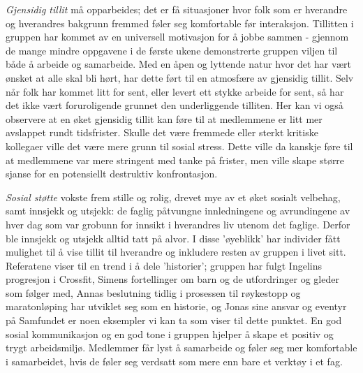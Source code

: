 \emph{Gjensidig tillit} må opparbeides; det er få situasjoner hvor folk som er hverandre og hverandres bakgrunn fremmed føler seg komfortable før interaksjon. Tillitten i gruppen har kommet av en universell motivasjon for å jobbe sammen - gjennom de mange mindre oppgavene i de første ukene demonstrerte gruppen viljen til både å arbeide og samarbeide. Med en åpen og lyttende natur hvor det har vært ønsket at alle skal bli hørt, har dette ført til en atmosfære av gjensidig tillit. Selv når folk har kommet litt for sent, eller levert ett stykke arbeide for sent, så har det ikke vært foruroligende grunnet den underliggende tilliten. Her kan vi også observere at en øket gjensidig tillit kan føre til at medlemmene er litt mer avslappet rundt tidsfrister. Skulle det være fremmede eller sterkt kritiske kollegaer ville det være mere grunn til sosial stress. Dette ville da kanskje føre til at medlemmene var mere stringent med tanke på frister, men ville skape større sjanse for en potensiellt destruktiv konfrontasjon.

\emph{Sosial støtte} vokste frem stille og rolig, drevet mye av et øket sosialt velbehag, samt innsjekk og utsjekk: de faglig påtvungne innledningene og avrundingene av hver dag som var grobunn for innsikt i hverandres liv utenom det faglige. Derfor ble innsjekk og utsjekk alltid tatt på alvor. I disse 'øyeblikk' har individer fått mulighet til å vise tillit til hverandre og inkludere resten av gruppen i livet sitt. Referatene viser til en trend i å dele 'historier'; gruppen har fulgt Ingelins progresjon i Crossfit, Simens fortellinger om barn og de utfordringer og gleder som følger med, Annas beslutning tidlig i prosessen til røykestopp og maratonløping har utviklet seg som en historie, og Jonas sine ansvar og eventyr på Samfundet er noen eksempler vi kan ta som viser til dette punktet. En god sosial kommunikasjon og en god tone i gruppen hjelper å skape et positiv og trygt arbeidsmiljø\cite{happy}. Medlemmer får lyst å samarbeide og føler seg mer komfortable i samarbeidet, hvis de føler seg verdsatt som mere enn bare et verktøy i et fag.

